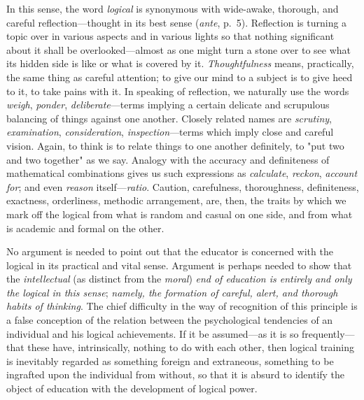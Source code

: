 \documentclass[letterpaper]{book}
\begin{document}
In this sense, the word \emph{logical} is synonymous with wide-awake,
thorough, and careful reflection---thought in its best sense
(\emph{ante}, p.\ 5). Reflection is turning a topic over in various
aspects and in various lights so that nothing significant about it shall
be overlooked---almost as one might turn a stone over to see what its
hidden side is like or what is covered by it. \emph{Thoughtfulness}
means, practically, the same thing as careful attention; to give our
mind to a subject is to give heed to it, to take pains with it. In
speaking of reflection, we naturally use the words \emph{weigh},
\emph{ponder}, \emph{deliberate}---terms implying a certain delicate and
scrupulous balancing of things against one another. Closely related
names are \emph{scrutiny}, \emph{examination}, \emph{consideration},
\emph{inspection}---terms which imply close and careful vision. Again,
to think is to relate things to one another definitely, to "put two and
two together" as we say. Analogy with the accuracy and definiteness of
mathematical combinations gives us such expressions as \emph{calculate},
\emph{reckon}, \emph{account for}; and even \emph{reason}
itself---\emph{ratio}. Caution, carefulness, thoroughness, definiteness,
exactness, orderliness, methodic arrangement, are, then, the traits by
which we mark off the logical from what is random and casual on one
side, and from what is academic and formal on the other.



No argument is needed to point out that the educator is concerned with
the logical in its practical and vital sense. Argument is perhaps needed
to show that the \emph{intellectual} (as distinct from the \emph{moral})
\emph{end of education is entirely and only the logical in this sense};
\emph{namely,
the formation of careful, alert, and thorough habits of thinking}. The
chief difficulty in the way of recognition of this principle is a false
conception of the relation between the psychological tendencies of an
individual and his logical achievements. If it be assumed---as it is so
frequently---that these have, intrinsically, nothing to do with each
other, then logical training is inevitably regarded as something foreign
and extraneous, something to be ingrafted upon the individual from
without, so that it is absurd to identify the object of education with
the development of logical power.
\end{document}
